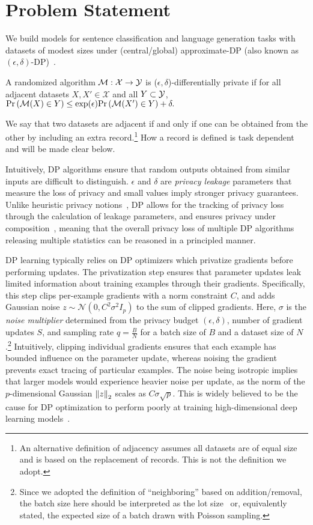\section{Problem Statement}
We build models for sentence classification and language generation tasks with datasets of modest sizes under (central/global) approximate-DP (also known as $(\epsilon, \delta)$-DP)~\citep{dwork2014algorithmic}. 
\begin{defi}
A randomized algorithm $\mathcal{M}: \mathcal{X} \to \mathcal{Y}$ is ($\epsilon, \delta$)-differentially private if for all adjacent datasets $X, X'\in\mathcal{X}$ and all $Y \subset \mathcal{Y}$, 
$
\mathrm{Pr}\left(\mathcal{M}(X) \in Y\right) \le \exp( \epsilon ) \mathrm{Pr}\left( \mathcal{M}(X') \in Y \right) + \delta.
\label{eq:epsilon_delta_dp}
$
\end{defi}
We say that two datasets are adjacent if and only if one can be obtained from the other by including an extra record.\footnote{An alternative definition of adjacency assumes all datasets are of equal size and is based on the replacement of records. This is not the definition we adopt. }
How a record is defined is task dependent and will be made clear below.

Intuitively, DP algorithms ensure that random outputs obtained from similar inputs are difficult to distinguish. 
$\epsilon$ and $\delta$ are \textit{privacy leakage} parameters that measure the loss of privacy and small values imply stronger privacy guarantees.
Unlike heuristic privacy notions~\citep{huang2020instahide}, DP allows for the tracking of privacy loss through the calculation of leakage parameters, and ensures privacy under composition~\citep{dwork2014algorithmic}, meaning that the overall privacy loss of multiple DP algorithms releasing multiple statistics can be reasoned in a principled manner.

DP learning typically relies on DP optimizers which privatize gradients before performing updates. 
The privatization step ensures that parameter updates leak limited information about training examples through their gradients.
Specifically, this step clips per-example gradients with a norm constraint $C$, and adds Gaussian noise $z\sim\mathcal{N}(0, C^2\sigma^2 I_p)$ to the sum of clipped gradients.
Here, $\sigma$ is the \textit{noise multiplier} determined from the privacy budget $(\epsilon, \delta)$, number of gradient updates $S$, and sampling rate $q=\tfrac{B}{N}$ for a batch size of $B$ and a dataset size of $N$.\footnote{Since we adopted the definition of ``neighboring'' based on addition/removal, the batch size here should be interpreted as the lot size~\citep{abadi2016deep} or, equivalently stated, the expected size of a batch drawn with Poisson sampling.}
Intuitively, clipping individual gradients ensures that each example has bounded influence on the parameter update, whereas noising the gradient prevents exact tracing of particular examples.
The noise being isotropic implies that larger models would experience heavier noise per update, as the norm of the $p$-dimensional Gaussian $\left\lVert z\right\rVert_2$ scales as $C \sigma \sqrt{p}$.
This is widely believed to be the cause for DP optimization to perform poorly at training high-dimensional deep learning models~\citep{gautum14,yu2021not}.


